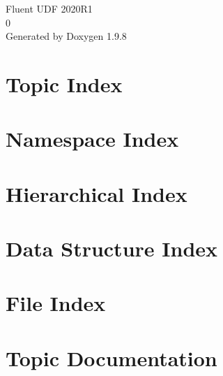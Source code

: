 \documentclass[twoside]{book}
\newcommand{\+}{\discretionary{\mbox{\scriptsize$\hookleftarrow$}}{}{}}
\newcommand{\clearemptydoublepage}{%
    \newpage{\pagestyle{empty}\cleardoublepage}%
  }
\begin{document}
  \raggedbottom
    \hypersetup{pageanchor=false,
                bookmarksnumbered=true,
                pdfencoding=unicode
               }
  \begin{titlepage}
  \vspace*{7cm}
  \begin{center}%
  {\Large Fluent UDF 2020\+R1}\\
  [1ex]\large 0 \\
  \vspace*{1cm}
  {\large Generated by Doxygen 1.9.8}\\
  \end{center}
  \end{titlepage}
  \clearemptydoublepage
  \tableofcontents
  \clearemptydoublepage
  \hypersetup{pageanchor=true}
\chapter{Topic Index}

\chapter{Namespace Index}

\chapter{Hierarchical Index}

\chapter{Data Structure Index}

\chapter{File Index}

\chapter{Topic Documentation}




\end{document}
